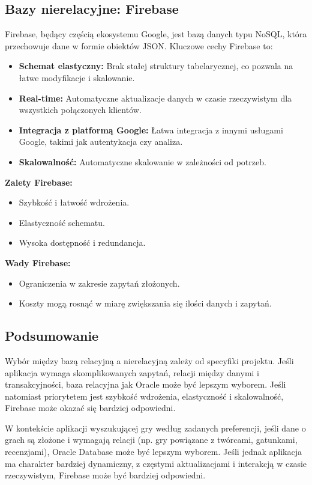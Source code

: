 \subsection{Bazy nierelacyjne: Firebase}

Firebase, będący częścią ekosystemu Google, jest bazą danych typu NoSQL, która przechowuje dane w formie obiektów JSON. Kluczowe cechy Firebase to:

\begin{itemize}
\item \textbf{Schemat elastyczny:} Brak stałej struktury tabelarycznej, co pozwala na łatwe modyfikacje i skalowanie.
\item \textbf{Real-time:} Automatyczne aktualizacje danych w czasie rzeczywistym dla wszystkich połączonych klientów.
\item \textbf{Integracja z platformą Google:} Łatwa integracja z innymi usługami Google, takimi jak autentykacja czy analiza.
\item \textbf{Skalowalność:} Automatyczne skalowanie w zależności od potrzeb.
\end{itemize}

\textbf{Zalety Firebase:}
\begin{itemize}
\item Szybkość i łatwość wdrożenia.
\item Elastyczność schematu.
\item Wysoka dostępność i redundancja.
\end{itemize}

\textbf{Wady Firebase:}
\begin{itemize}
\item Ograniczenia w zakresie zapytań złożonych.
\item Koszty mogą rosnąć w miarę zwiększania się ilości danych i zapytań.
\end{itemize}
\cite{firebaseDb}
\subsection{Podsumowanie}

Wybór między bazą relacyjną a nierelacyjną zależy od specyfiki projektu. Jeśli aplikacja wymaga skomplikowanych zapytań, relacji między danymi i transakcyjności, baza relacyjna jak Oracle może być lepszym wyborem. Jeśli natomiast priorytetem jest szybkość wdrożenia, elastyczność i skalowalność, Firebase może okazać się bardziej odpowiedni.

W kontekście aplikacji wyszukującej gry według zadanych preferencji, jeśli dane o grach są złożone i wymagają relacji (np. gry powiązane z twórcami, gatunkami, recenzjami), Oracle Database może być lepszym wyborem. Jeśli jednak aplikacja ma charakter bardziej dynamiczny, z częstymi aktualizacjami i interakcją w czasie rzeczywistym, Firebase może być bardziej odpowiedni.